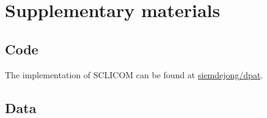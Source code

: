 \section{Supplementary materials}
\subsection{Code}
The implementation of SCLICOM can be found at \href{https://github.io/siemdejong/dpat}{ siemdejong/dpat}.

\subsection{Data}
